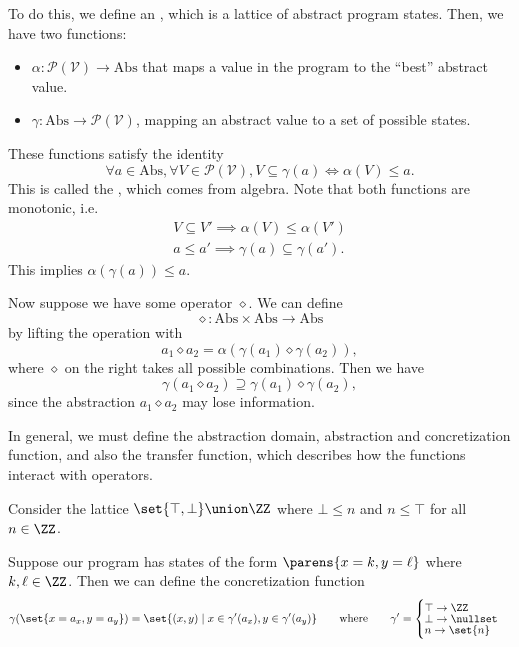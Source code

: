 \documentclass[class=scrartcl]{standalone}
\begin{document}
To do this, we define an ,
which is a lattice of abstract program states.
Then, we have two functions:
\begin{itemize}[nosep]
  \item {}
        \(\alpha \colon \mathcal P(\mathcal V) \to \text{Abs}\)
        that maps a value in the program to the ``best'' abstract value.
  \item {}
        \(\gamma \colon \text{Abs} \to \mathcal P(\mathcal V)\),
        mapping an abstract value to a set of possible states.
\end{itemize}
These functions satisfy the identity
\[
  \forall a \in \text{Abs},
    \forall V \in \mathcal P(\mathcal V),
      V \subseteq \gamma(a) \iff \alpha(V) \leq a.
\]
This is called the , which comes from algebra.
Note that both functions are monotonic, i.e.
\begin{gather*}
  V \subseteq V' \implies \alpha(V) \leq \alpha(V') \\
  a \leq a' \implies \gamma(a) \subseteq \gamma(a').
\end{gather*}
This implies \(\alpha(\gamma(a)) \leq a\).


Now suppose we have some operator \(\diamond\).
We can define
\[
  \diamond \colon \text{Abs} \times \text{Abs} \to \text{Abs}
\]
by lifting the operation with
\[
  a_1 \diamond a_2 = \alpha(\gamma(a_1) \diamond \gamma(a_2)),
\]
where \(\diamond\) on the right takes all possible combinations.
Then we have
\[
  \gamma(a_1 \diamond a_2) \supseteq \gamma(a_1) \diamond \gamma(a_2),
\]
since the abstraction \(a_1 \diamond a_2\) may lose information.

In general, we must define the abstraction domain,
abstraction and concretization function,
and also the transfer function,
which describes how the functions interact with operators.

\begin{example}
  Consider the lattice \(\set{\top, \bot} \union \ZZ\)
  where \(\bot \leq n\) and \(n \leq \top\) for all \(n \in \ZZ\).
  
  Suppose our program has states of the form \(\parens{x = k, y = \ell}\)
  where \(k, \ell \in \ZZ\).
  Then we can define the concretization function
  \[
    \gamma(\set{x = a_x, y = a_y}) =
      \set{(x, y) \mid x \in \gamma'(a_x),
                       y \in \gamma'(a_y)}
  \qquad \text{where} \qquad
    \gamma' = \begin{cases}
      \top \to \ZZ \\[-1ex]
      \bot \to \nullset \\[-1ex]
      n \to \set{n}
    \end{cases}
  \]


\end{example}
\end{document}
